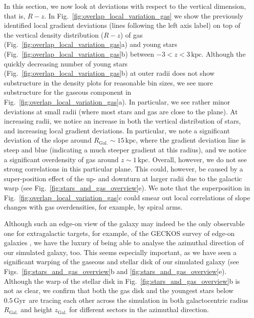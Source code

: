 \documentclass[twocolumn,apj,numberedappendix,appendixfloats]{openjournal}
\newcommand{\nihaoAGEmax}{$0.5\,\mathrm{Gyr}$}
\begin{document}
\begin{CJK*}{UTF8}{gbsn}
In this section, we now look at deviations with respect to the vertical dimension, that is, $R-z$. In Fig.~\ref{fig:overlap_local_variation_gas} we show the previously identified local gradient deviations (lines following the left axis label) on top of the vertical density distribution ($R-z$) of gas (Fig.~\ref{fig:overlap_local_variation_gas}a) and young stars (Fig.~\ref{fig:overlap_local_variation_gas}b) between $-3 < z < 3\,\mathrm{kpc}$. Although the quickly decreasing number of young stars (Fig.~\ref{fig:overlap_local_variation_gas}b) at outer radii does not show substructure in the density plots for reasonable bin sizes, we see more substructure for the gaseous component in Fig.~\ref{fig:overlap_local_variation_gas}a). In particular, we see rather minor deviations at small radii (where most stars and gas are close to the plane). At increasing radii, we notice an increase in both the vertical distribution of stars, and increasing local gradient deviations. In particular, we note a significant deviation of the slope around $R_\mathrm{Gal.} \sim 15\,\mathrm{kpc}$, where the gradient deviation line is steep and blue (indicating a much steeper gradient at this radius), and we notice a significant overdensity of gas around $z \sim 1\,\mathrm{kpc}$. Overall, however, we do not see strong correlations in this particular plane. This could, however, be caused by a super-position effect of the up- and downturn at larger radii due to the galactic warp (see Fig.~\ref{fig:stars_and_gas_overview}e). We note that the superposition in Fig.~\ref{fig:overlap_local_variation_gas}c could smear out local correlations of slope changes with gas overdensities, for example, by spiral arms.

Although such an edge-on view of the galaxy may indeed be the only observable one for extragalactic targets, for example, of the GECKOS survey of edge-on galaxies \citep{GECKOS2023}, we have the luxury of being able to analyse the azimuthal direction of our simulated galaxy, too. This seems especially important, as we have seen a significant warping of the gaseous and stellar disk of our simulated galaxy (see Figs.~\ref{fig:stars_and_gas_overview}b and \ref{fig:stars_and_gas_overview}e). Although the warp of the stellar disk in Fig.~\ref{fig:stars_and_gas_overview}b is not as clear, we confirm that both the gas disk and the youngest stars below \nihaoAGEmax\ are tracing each other across the simulation in both galactocentric radius $R_\mathrm{Gal.}$ and height $z_\mathrm{Gal.}$ for different sectors in the azimuthal direction.


\end{CJK*}
\end{document}
